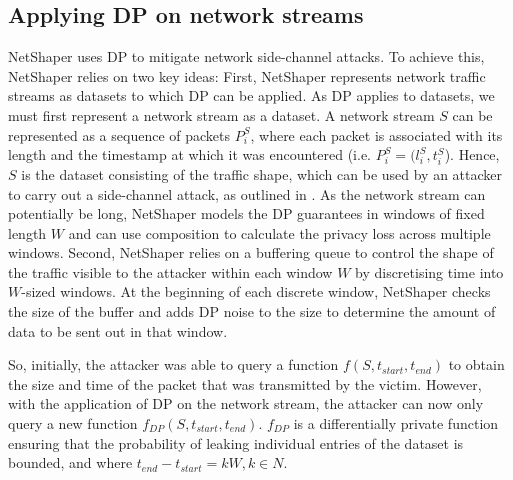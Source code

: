 \subsection{Applying DP on network streams}
NetShaper uses DP to mitigate network side-channel attacks. 
To achieve this, NetShaper relies on two key ideas: 
First, NetShaper represents network traffic streams as datasets to which DP can be applied.
As DP applies to datasets, we must first represent a network stream as a dataset.
A network stream $S$ can be represented as a sequence of packets $P_i^S$, where each packet is associated with its length and the timestamp at which it was encountered (i.e. $P_i^S = (l_i^S, t_i^S$).
Hence, $S$ is the dataset consisting of the traffic shape, which can be used by an attacker to carry out a side-channel attack, as outlined in .
As the network stream can potentially be long, NetShaper models the DP guarantees in windows of fixed length $W$ and can use composition to calculate the privacy loss across multiple windows.
Second, NetShaper relies on a buffering queue to control the shape of the traffic visible to the attacker within each window $W$ by discretising time into $W$-sized windows.
At the beginning of each discrete window, NetShaper checks the size of the buffer and adds DP noise to the size to determine the amount of data to be sent out in that window.


So, initially, the attacker was able to query a function $f(S, t_{start}, t_{end})$ to obtain the size and time of the packet that was transmitted by the victim. 
However, with the application of DP on the network stream, the attacker can now only query a new function $f_{DP}(S, t_{start}, t_{end})$.
$f_{DP}$ is a differentially private function ensuring that the probability of leaking individual entries of the dataset is bounded, and where $t_{end} - t_{start} = kW, k \in N$.

\endinput

Note: Should we add stuff about sensitivity? (I don't think it's necessary for my thesis)